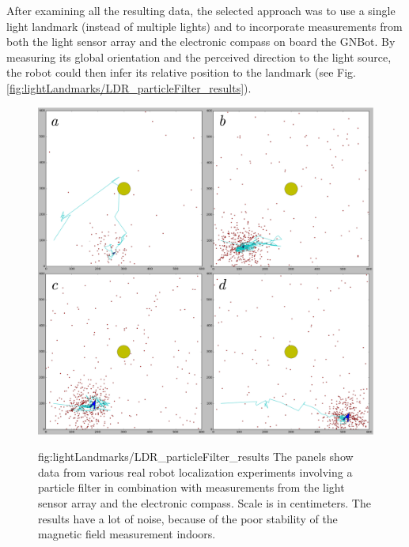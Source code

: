 

After examining all the resulting data, the selected approach was to use a single light landmark (instead of multiple lights) and to incorporate measurements from both the light sensor array and the electronic compass on board the GNBot.
By measuring its global orientation and the perceived direction to the light source, the robot could then infer its relative position to the landmark (see Fig. \ref{fig:lightLandmarks/LDR_particleFilter_results}).


\begin{figure}[h!]
\centerline{\mbox{\includegraphics[width=14cm]{images/lightLandmarks/LDR_particleFilter_results.eps}}}
{fig:lightLandmarks/LDR_particleFilter_results}{
The panels show data from various real robot localization experiments involving a particle filter in combination with measurements from the light sensor array and the electronic compass. Scale is in centimeters. The results have a lot of noise, because of the poor stability of the magnetic field measurement indoors.
}
\end{figure}

